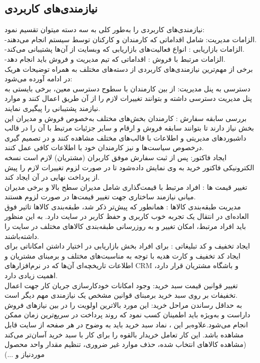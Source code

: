 \documentclass[14pt]{article}
\begin{document}
\begin{flushright}
\begin{itemize}
\section{نیازمندی‌های کاربردی }
نیازمندی‌های کاربردی را به‌طور کلی به سه دسته میتوان تقسیم نمود:\\
-الزامات مدیریت: شامل اقداماتی که کارمندان و کارکنان توسط سیستم انجام می‌دهند. \\
-الزامات بازاریابی : انواع فعالیت‌های بازاریابی که وبسایت از آن‌ها پشتیبانی می‌کند. \\
-الزامات مرتبط با فروش : اقداماتی که تیم مدیریت و فروش باید انجام دهد.\\
برخی از مهم‌ترین نیازمندی‌های کاربردی از دسته‌های مختلف به همراه توضیحات هریک در ادامه آورده می‌شود:\\
دسترسی به پنل مدیریت: از بین کارمندان با سطوح دسترسی معین، برخی بایستی به پنل مدیریت دسترسی داشته و بتوانند تغییرات لازم را از آن طریق اعمال کنند و موارد نیازمند پشتیبانی را پیگیری نمایند.\\
بررسی سابقه سفارش : کارمندان بخش‌های مختلف به‌خصوص فروش و مدیران این بخش نیاز دارند تا بتوانند سابقه فروش و ارقام و سایر جزئیات مرتبط با آن را در قالب داشبوردهای مدیریتی و اطلاعات با قالب‌های مختلف مشاهده کنند و در تصمیم گیری درخصوص سیاست‌ها و نیز کارمندان خود با اطلاعات کافی عمل کنند.\\
ایجاد فاکتور: پس از ثبت سفارش موفق کاربران (مشتریان) لازم است نسخه الکترونیکی فاکتور خرید به وی نمایش داده‌شود تا در صورت لزوم تغییرات لازم را پیش از پرداخت نهایی در آن ایجاد کند.\\
تغییر قیمت ها : افراد مرتبط با قیمت‌گذاری شامل مدیران سطح بالا و برخی مدیران میانی نیازمند ساختاری جهت تغییر قیمت‌ها در صورت لزوم هستند.\\
مدیریت طبقه‌بندی کالاها : همانطور که پیش‌تر ذکر شد، طبقه‌بندی کالاها تاثیر فوق العاده‌ای در انتقال یک تجربه خوب کاربری و حفظ کاربر در سایت دارد. به این منظور باید افراد مرتبط، امکان تغییر و به روزرسانی طبقه‌بندی کالاهای مختلف در سایت را داشته‌باشند.\\
ایجاد تخفیف و کد تبلیغاتی : برای افراد بخش بازاریابی در اختیار داشتن امکاناتی  برای ایجاد کد تخفیف و کارت هدیه با توجه به مناسبت‌های مختلف و برمبنای مشتریان و اطلاعات تاریخچه‌ای آن‌ها که در نرم‌افزارهای CRM و باشگاه مشتریان قرار دارد، اهمیت زیادی دارد.\\
تغییر قوانین قیمت سبد خرید: وجود امکانات خودکارسازی جریان کار جهت اعمال تخفیفات بر روی سبد خرید برمبنای قوانین مشخص یک نیازمندی مهم دیگر است.\\
 به حداقل رساندن مراحل خرید: این مورد بالاترین اولویت را در بین نیازهای فروش داراست و  به‌ویژه باید اطمینان کسب نمود که روند پرداخت در سریع‌ترین زمان ممکن انجام می‌شود.علاوه‌بر این ، نماد سبد خرید باید به وضوح در هر صفحه از سایت قابل مشاهده باشد. این کار تعامل خریدار بالقوه را برای کار با سبد خرید آسان‌تر می‌کند (مشاهده کالاهای انتخاب شده، حذف موارد غیر ضروری، تنظیم مقدار واحد محصول موردنیاز و ...)\\

\end{itemize}
\end{flushright}
\end{document}
